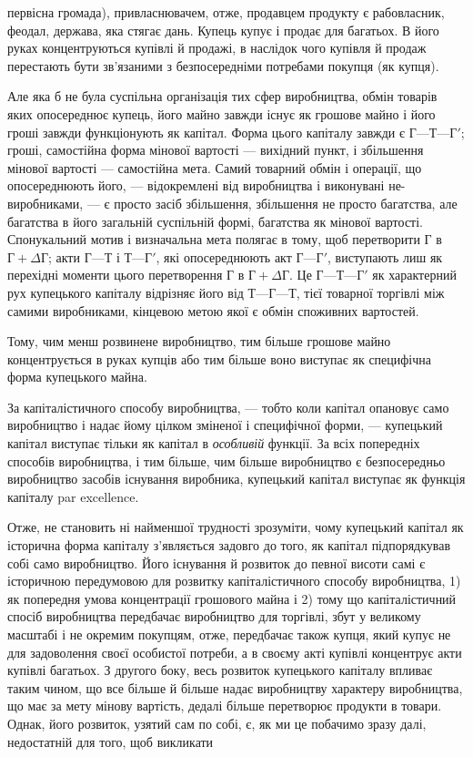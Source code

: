 \parcont{}  %
первісна громада), привласнювачем, отже, продавцем продукту
є рабовласник, феодал, держава, яка стягає дань. Купець купує
і продає для багатьох. В його руках концентруються купівлі
й продажі, в наслідок чого купівля й продаж перестають
бути зв’язаними з безпосередніми потребами покупця (як
купця).

Але яка б не була суспільна організація тих сфер виробництва,
обмін товарів яких опосереднює купець, його майно завжди
існує як грошове майно і його гроші завжди функціонують
як капітал. Форма цього капіталу завжди є $Г — Т — Г'$; гроші,
самостійна форма мінової вартості — вихідний пункт, і збільшення
мінової вартості — самостійна мета. Самий товарний обмін і операції,
що опосереднюють його, — відокремлені від виробництва
і виконувані не-виробниками, — є просто засіб збільшення, збільшення
не просто багатства, але багатства в його загальній суспільній
формі, багатства як мінової вартості. Спонукальний мотив
і визначальна мета полягає в тому, щоб перетворити $Г$ в $Г + ΔГ$;
акти $Г — Т$ і $Т — Г'$, які опосереднюють акт $Г — Г'$, виступають
лиш як перехідні моменти цього перетворення $Г$ в $Г + ΔГ$. Це
$Г — Т — Г'$ як характерний рух купецького капіталу відрізняє його
від $Т — Г — Т$, тієї товарної торгівлі між самими виробниками,
кінцевою метою якої є обмін споживних вартостей.

Тому, чим менш розвинене виробництво, тим більше грошове
майно концентрується в руках купців або тим більше воно виступає
як специфічна форма купецького майна.

За капіталістичного способу виробництва, — тобто коли капітал
опановує само виробництво і надає йому цілком зміненої
і специфічної форми, — купецький капітал виступає тільки як
капітал в \emph{особливій} функції. За всіх попередніх способів виробництва,
і тим більше, чим більше виробництво є безпосередньо
виробництво засобів існування виробника, купецький капітал
виступає як функція капіталу par excellence.

Отже, не становить ні найменшої трудності зрозуміти, чому
купецький капітал як історична форма капіталу з’являється задовго
до того, як капітал підпорядкував собі само виробництво.
Його існування й розвиток до певної висоти самі є історичною
передумовою для розвитку капіталістичного способу
виробництва, 1) як попередня умова концентрації грошового
майна і 2) тому що капіталістичний спосіб виробництва передбачає
виробництво для торгівлі, збут у великому масштабі і не
окремим покупцям, отже, передбачає також купця, який купує
не для задоволення своєї особистої потреби, а в своєму акті купівлі
концентрує акти купівлі багатьох. З другого боку, весь
розвиток купецького капіталу впливає таким чином, що все
більше й більше надає виробництву характеру виробництва, що
має за мету мінову вартість, дедалі більше перетворює продукти
в товари. Однак, його розвиток, узятий сам по собі, є, як
ми це побачимо зразу далі, недостатній для того, щоб викликати
\parbreak{}  %
